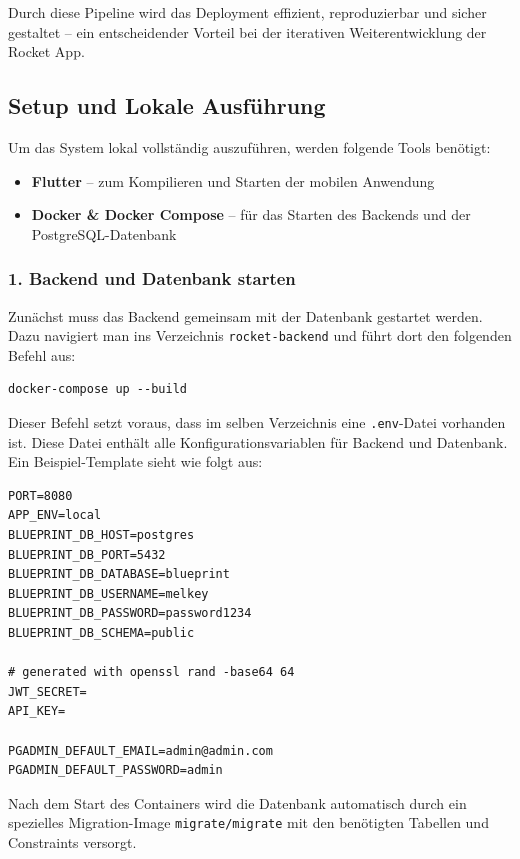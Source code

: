 \documentclass[11pt,a4paper]{article}
\begin{document}
Durch diese Pipeline wird das Deployment effizient, reproduzierbar und sicher gestaltet – ein entscheidender Vorteil bei der iterativen Weiterentwicklung der Rocket App.

\subsection{Setup und Lokale Ausführung}
Um das System lokal vollständig auszuführen, werden folgende Tools benötigt:

\begin{itemize}
    \item \textbf{Flutter}\cite{flutter} -- zum Kompilieren und Starten der mobilen Anwendung
    \item \textbf{Docker \& Docker Compose}\cite{docker} -- für das Starten des Backends und der PostgreSQL-Datenbank\cite{postgresql}
\end{itemize}

\subsubsection{1. Backend und Datenbank starten}

Zunächst muss das Backend gemeinsam mit der Datenbank gestartet werden. Dazu navigiert man ins Verzeichnis \texttt{rocket-backend} und führt dort den folgenden Befehl aus:

\begin{verbatim}
docker-compose up --build
\end{verbatim}

Dieser Befehl setzt voraus, dass im selben Verzeichnis eine \texttt{.env}-Datei vorhanden ist. Diese Datei enthält alle Konfigurationsvariablen für Backend und Datenbank. Ein Beispiel-Template sieht wie folgt aus:

\begin{verbatim}
PORT=8080
APP_ENV=local
BLUEPRINT_DB_HOST=postgres
BLUEPRINT_DB_PORT=5432
BLUEPRINT_DB_DATABASE=blueprint
BLUEPRINT_DB_USERNAME=melkey
BLUEPRINT_DB_PASSWORD=password1234
BLUEPRINT_DB_SCHEMA=public

# generated with openssl rand -base64 64
JWT_SECRET=
API_KEY=

PGADMIN_DEFAULT_EMAIL=admin@admin.com
PGADMIN_DEFAULT_PASSWORD=admin
\end{verbatim}

Nach dem Start des Containers wird die Datenbank automatisch durch ein spezielles Migration-Image \texttt{migrate/migrate}\cite{migrate} mit den benötigten Tabellen und Constraints versorgt.
\end{document}
